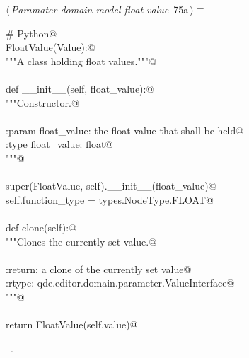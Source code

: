 \documentclass[
    a4paper,      %
    10pt,         %
    openright,    %
    notitlepage,  %
    parskip=half, %
]{scrreprt}       %
\theoremstyle{definition}                    %
\begin{document}
\begin{flushleft} \small
\begin{minipage}{\linewidth}\label{scrap122}\raggedright\small
{} $\langle\,${\itshape Paramater domain model float value}\nobreak\ {\footnotesize {75a}}$\,\rangle\equiv$
\vspace{-1exm}
\begin{list}{}{} \item
\mbox{}\lstinline@# Python@\\
\mbox{}\lstinline@class FloatValue(Value):@\\
\mbox{}\lstinline@    """A class holding float values."""@\\
\mbox{}\lstinline@@\\
\mbox{}\lstinline@    def __init__(self, float_value):@\\
\mbox{}\lstinline@        """Constructor.@\\
\mbox{}\lstinline@@\\
\mbox{}\lstinline@        :param float_value: the float value that shall be held@\\
\mbox{}\lstinline@        :type  float_value: float@\\
\mbox{}\lstinline@        """@\\
\mbox{}\lstinline@@\\
\mbox{}\lstinline@        super(FloatValue, self).__init__(float_value)@\\
\mbox{}\lstinline@        self.function_type = types.NodeType.FLOAT@\\
\mbox{}\lstinline@@\\
\mbox{}\lstinline@    def clone(self):@\\
\mbox{}\lstinline@        """Clones the currently set value.@\\
\mbox{}\lstinline@@\\
\mbox{}\lstinline@        :return: a clone of the currently set value@\\
\mbox{}\lstinline@        :rtype:  qde.editor.domain.parameter.ValueInterface@\\
\mbox{}\lstinline@        """@\\
\mbox{}\lstinline@@\\
\mbox{}\lstinline@        return FloatValue(self.value)@{\NWsep}
\end{list}
\vspace{-1.5ex}
\footnotesize
\begin{list}{}{\setlength{\itemsep}{-\parsep}\setlength{\itemindent}{-\leftmargin}}
\item \NWtxtMacroRefIn\ .

\item{}
\end{list}
\end{minipage}\vspace{4ex}
\end{flushleft}
\end{document}
